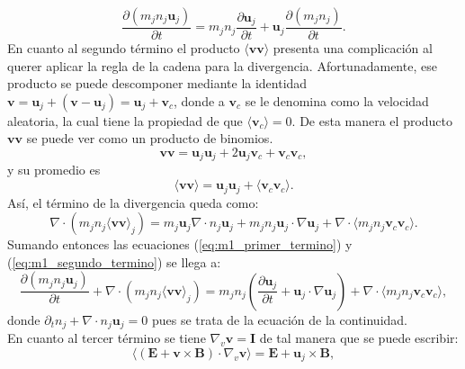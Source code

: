 \documentclass[../tesis_main_file.tex]{subfiles}
\begin{document}
\begin{equation}
\label{eq:m1_primer_termino}
\frac{\partial (m_jn_j\textbf{u}_j)}{\partial t}= m_jn_j\frac{\partial \textbf{u}_j}{\partial t}+ \textbf{u}_j\frac{\partial (m_jn_j)}{\partial t}.
\end{equation}
En cuanto al segundo término el producto $\langle \textbf{v} \textbf{v} \rangle $ presenta una complicación al querer aplicar la regla de la cadena para la divergencia. Afortunadamente, ese producto se puede descomponer mediante la identidad
$\textbf{v}=\textbf{u}_j+(\textbf{v}-\textbf{u}_j)=\textbf{u}_j+\textbf{v}_c$, donde a $\textbf{v}_c$ se le denomina como la velocidad aleatoria, la cual tiene la propiedad de que $\langle \textbf{v}_c \rangle=0$.
De esta manera el producto $\textbf{v}\textbf{v}$ se puede ver como un producto de binomios.
\begin{equation}
\textbf{v}\textbf{v}=\textbf{u}_j \textbf{u}_j + 2\textbf{u}_j \textbf{v}_c + \textbf{v}_c \textbf{v}_c,
\end{equation}
y su promedio es
\begin{equation}
\langle \textbf{v} \textbf{v} \rangle = \textbf{u}_j \textbf{u}_j +\langle \textbf{v}_c \textbf{v}_c \rangle.
\end{equation}
Así, el término de la divergencia queda como:
\begin{equation}
\label{eq:m1_segundo_termino}
\nabla \cdot (m_jn_j\langle \textbf{v}\textbf{v} \rangle_j)=m_j \textbf{u}_j\nabla \cdot n_j \textbf{u}_j+m_jn_j\textbf{u}_j\cdot \nabla \textbf{u}_j+\nabla \cdot \langle m_jn_j \textbf{v}_c \textbf{v}_c \rangle.
\end{equation}
Sumando entonces las ecuaciones (\ref{eq:m1_primer_termino}) y (\ref{eq:m1_segundo_termino}) se llega a:
\begin{equation}
\frac{\partial (m_jn_j\textbf{u}_j)}{\partial t}+\nabla \cdot (m_jn_j\langle \textbf{v}\textbf{v} \rangle_j)=m_jn_j \left( \frac{\partial \textbf{u}_j}{\partial t}+\textbf{u}_j\cdot \nabla \textbf{u}_j \right)+ \nabla \cdot \langle m_jn_j \textbf{v}_c \textbf{v}_c \rangle,
\end{equation}
donde $\partial_t n_j+\nabla \cdot n_j \textbf{u}_j=0$ pues se trata de la ecuación de la continuidad.\\
En cuanto al tercer término se tiene $\nabla _v \textbf{v}=\textbf{I}$ de tal manera que se puede escribir:
\begin{equation}
    \label{eq:promedio_lorentz_1}
    \langle (\textbf{E}+\textbf{v}\times \textbf{B})\cdot \nabla_v\textbf{v}\rangle = \textbf{E}+\textbf{u}_j\times \textbf{B},
\end{equation}
\end{document}
